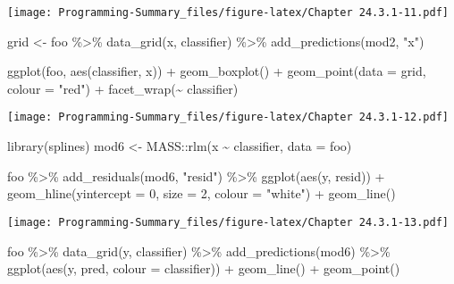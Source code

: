 \documentclass[
]{article}
\newenvironment{Shaded}{\begin{snugshade}}{\end{snugshade}}
\newcommand{\AttributeTok}[1]{\textcolor[rgb]{0.77,0.63,0.00}{#1}}
\newcommand{\DecValTok}[1]{\textcolor[rgb]{0.00,0.00,0.81}{#1}}
\newcommand{\FunctionTok}[1]{\textcolor[rgb]{0.00,0.00,0.00}{#1}}
\newcommand{\NormalTok}[1]{#1}
\newcommand{\OtherTok}[1]{\textcolor[rgb]{0.56,0.35,0.01}{#1}}
\newcommand{\SpecialCharTok}[1]{\textcolor[rgb]{0.00,0.00,0.00}{#1}}
\newcommand{\StringTok}[1]{\textcolor[rgb]{0.31,0.60,0.02}{#1}}
\begin{document}
\texttt{[image: Programming-Summary\_files/figure-latex/Chapter 24.3.1-11.pdf]}

\begin{Shaded}
\begin{Highlighting}[]
\NormalTok{grid }\OtherTok{\textless{}{-}}\NormalTok{ foo }\SpecialCharTok{\%\textgreater{}\%} 
  \FunctionTok{data\_grid}\NormalTok{(x, classifier) }\SpecialCharTok{\%\textgreater{}\%} 
  \FunctionTok{add\_predictions}\NormalTok{(mod2, }\StringTok{"x"}\NormalTok{)}

\FunctionTok{ggplot}\NormalTok{(foo, }\FunctionTok{aes}\NormalTok{(classifier, x)) }\SpecialCharTok{+}
  \FunctionTok{geom\_boxplot}\NormalTok{() }\SpecialCharTok{+} 
  \FunctionTok{geom\_point}\NormalTok{(}\AttributeTok{data =}\NormalTok{ grid, }\AttributeTok{colour =} \StringTok{"red"}\NormalTok{) }\SpecialCharTok{+} 
  \FunctionTok{facet\_wrap}\NormalTok{(}\SpecialCharTok{\textasciitilde{}}\NormalTok{ classifier)}
\end{Highlighting}
\end{Shaded}

\texttt{[image: Programming-Summary\_files/figure-latex/Chapter 24.3.1-12.pdf]}

\begin{Shaded}
\begin{Highlighting}[]
\FunctionTok{library}\NormalTok{(splines)}
\NormalTok{mod6 }\OtherTok{\textless{}{-}}\NormalTok{ MASS}\SpecialCharTok{::}\FunctionTok{rlm}\NormalTok{(x }\SpecialCharTok{\textasciitilde{}}\NormalTok{ classifier, }\AttributeTok{data =}\NormalTok{ foo)}

\NormalTok{foo }\SpecialCharTok{\%\textgreater{}\%} 
  \FunctionTok{add\_residuals}\NormalTok{(mod6, }\StringTok{"resid"}\NormalTok{) }\SpecialCharTok{\%\textgreater{}\%} 
  \FunctionTok{ggplot}\NormalTok{(}\FunctionTok{aes}\NormalTok{(y, resid)) }\SpecialCharTok{+} 
  \FunctionTok{geom\_hline}\NormalTok{(}\AttributeTok{yintercept =} \DecValTok{0}\NormalTok{, }\AttributeTok{size =} \DecValTok{2}\NormalTok{, }\AttributeTok{colour =} \StringTok{"white"}\NormalTok{) }\SpecialCharTok{+} 
  \FunctionTok{geom\_line}\NormalTok{()}
\end{Highlighting}
\end{Shaded}

\texttt{[image: Programming-Summary\_files/figure-latex/Chapter 24.3.1-13.pdf]}

\begin{Shaded}
\begin{Highlighting}[]
\NormalTok{foo }\SpecialCharTok{\%\textgreater{}\%} 
  \FunctionTok{data\_grid}\NormalTok{(y, classifier) }\SpecialCharTok{\%\textgreater{}\%} 
  \FunctionTok{add\_predictions}\NormalTok{(mod6) }\SpecialCharTok{\%\textgreater{}\%} 
  \FunctionTok{ggplot}\NormalTok{(}\FunctionTok{aes}\NormalTok{(y, pred, }\AttributeTok{colour =}\NormalTok{ classifier)) }\SpecialCharTok{+} 
  \FunctionTok{geom\_line}\NormalTok{() }\SpecialCharTok{+}
  \FunctionTok{geom\_point}\NormalTok{()}
\end{Highlighting}
\end{Shaded}
\end{document}
